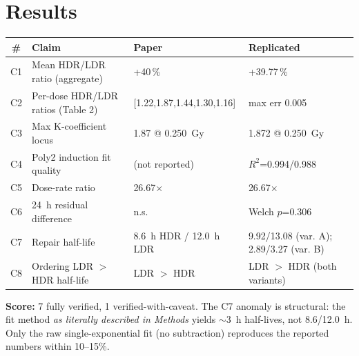 \documentclass[11pt]{article}
\begin{document}
\section{Results}
\begin{tabular}{clll}
\toprule
\# & Claim & Paper & Replicated \\
\midrule
C1 & Mean HDR/LDR ratio (aggregate) & +40\,\% & +39.77\,\% \\
C2 & Per-dose HDR/LDR ratios (Table 2) & [1.22,1.87,1.44,1.30,1.16] & max err 0.005 \\
C3 & Max K-coefficient locus & 1.87 @ 0.250~Gy & 1.872 @ 0.250~Gy \\
C4 & Poly2 induction fit quality & (not reported) & $R^2$=0.994/0.988 \\
C5 & Dose-rate ratio & 26.67$\times$ & 26.67$\times$ \\
C6 & 24~h residual difference & n.s. & Welch $p$=0.306 \\
C7 & Repair half-life & 8.6~h HDR / 12.0~h LDR & 9.92/13.08 (var. A); 2.89/3.27 (var. B) \\
C8 & Ordering LDR $>$ HDR half-life & LDR $>$ HDR & LDR $>$ HDR (both variants) \\
\bottomrule
\end{tabular}

\textbf{Score:} 7 fully verified, 1 verified-with-caveat. The C7 anomaly is
structural: the fit method \emph{as literally described in Methods} yields
$\sim$3~h half-lives, not 8.6/12.0~h. Only the raw single-exponential fit
(no subtraction) reproduces the reported numbers within 10--15\%.
\end{document}
